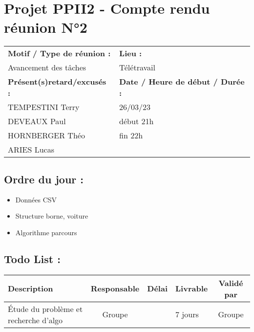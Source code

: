 \documentclass{article}
\begin{document}
\section*{Projet PPII2 - Compte rendu réunion N°2}
\begin{tabular}{|p{7cm}|p{6cm}|}
    \hline
    \textbf{Motif / Type de réunion :}
    & \textbf{Lieu :}
    \\
    Avancement des tâches
    &
    Télétravail
    \\ \hline
    \textbf{Présent(s)retard/excusés :}
    &
    \textbf{Date / Heure de début / Durée :}
    \\
    TEMPESTINI Terry &  26/03/23\\
    DEVEAUX Paul & début 21h\\
    HORNBERGER Théo & fin 22h\\
    ARIES Lucas &
    \\ \hline
\end{tabular}

\subsection*{Ordre du jour :}
\begin{itemize}
    \item{Données CSV}
    \item{Structure borne, voiture}
    \item{Algorithme parcours}
\end{itemize}

\subsection*{Todo List :}
\begin{tabular}{|p{3.5cm}|c|c|p{4.5cm}|c|}
    \hline
    Description & Responsable & Délai & Livrable & Validé par
    \\ \hline
    Étude du problème et recherche d'algo & Groupe &  & 7 jours & Groupe  \\\hline

\end{tabular}
\end{document}
